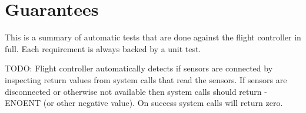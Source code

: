 \hypertarget{group__NINJASPEC}{\section{Guarantees}
\label{group__NINJASPEC}
}
This is a summary of automatic tests that are done against the flight controller in full. Each requirement is always backed by a unit test.


\begin{DoxyItemize}
\item T\+O\+D\+O\+: Flight controller automatically detects if sensors are connected by inspecting return values from system calls that read the sensors. If sensors are disconnected or otherwise not available then system calls should return -\/\+E\+N\+O\+E\+N\+T (or other negative value). On success system calls will return zero. 
\end{DoxyItemize}